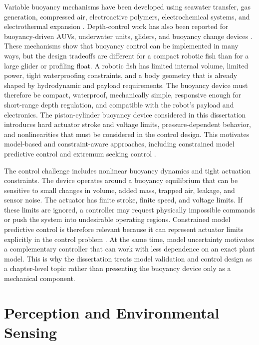 \documentclass{uhcoethesis}
\begin{document}
Variable buoyancy mechanisms have been developed using seawater transfer, gas generation, compressed air, electroactive polymers, electrochemical systems, and electrothermal expansion \cite{Kobayashi2010,Vasiljevic2019,Um2011,Chen2017,Yazji2021,Wood2015,Hou2020}. Depth-control work has also been reported for buoyancy-driven AUVs, underwater units, gliders, and buoyancy change devices \cite{Choyekh2016,Claus2012,Carneiro2023}. These mechanisms show that buoyancy control can be implemented in many ways, but the design tradeoffs are different for a compact robotic fish than for a large glider or profiling float. A robotic fish has limited internal volume, limited power, tight waterproofing constraints, and a body geometry that is already shaped by hydrodynamic and payload requirements. The buoyancy device must therefore be compact, waterproof, mechanically simple, responsive enough for short-range depth regulation, and compatible with the robot's payload and electronics. The piston-cylinder buoyancy device considered in this dissertation introduces hard actuator stroke and voltage limits, pressure-dependent behavior, and nonlinearities that must be considered in the control design. This motivates model-based and constraint-aware approaches, including constrained model predictive control and extremum seeking control \cite{Rawlings2017,Scokaert1998,Masood2023,Masood2026ESCBCD}.

The control challenge includes nonlinear buoyancy dynamics and tight actuation constraints. The device operates around a buoyancy equilibrium that can be sensitive to small changes in volume, added mass, trapped air, leakage, and sensor noise. The actuator has finite stroke, finite speed, and voltage limits. If these limits are ignored, a controller may request physically impossible commands or push the system into undesirable operating regions. Constrained model predictive control is therefore relevant because it can represent actuator limits explicitly in the control problem \cite{Rawlings2017,Scokaert1998}. At the same time, model uncertainty motivates a complementary controller that can work with less dependence on an exact plant model. This is why the dissertation treats model validation and control design as a chapter-level topic rather than presenting the buoyancy device only as a mechanical component.

\section{Perception and Environmental Sensing}
\end{document}
